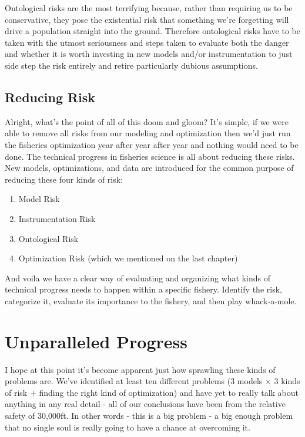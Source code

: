 \documentclass[11pt,a5paper]{book}
\begin{document}
Ontological risks are the most terrifying because, rather than requiring us to be conservative, they pose the existential risk that something we're forgetting will drive a population straight into the ground. Therefore ontological risks have to be taken with the utmost seriousness and steps taken to evaluate both the danger and whether it is worth investing in new models and/or instrumentation to just side step the risk entirely and retire particularly dubious assumptions. 

\section{Reducing Risk}
Alright, what's the point of all of this doom and gloom? It's simple, if we were able to remove all risks from our modeling and optimization then we'd just run the fisheries optimization year after year after year and nothing would need to be done. The technical progress in fisheries science is all about reducing these risks. New models, optimizations, and data are introduced for the common purpose of reducing these four kinds of risk:

\begin{enumerate}
\item Model Risk
\item Instrumentation Risk
\item Ontological Risk
\item Optimization Risk (which we mentioned on the last chapter)
\end{enumerate}

And voila we have a clear way of evaluating and organizing what kinds of technical progress needs to happen within a specific fishery. Identify the risk, categorize it, evaluate its importance to the fishery, and then play whack-a-mole. 
\newpage

\chapter{Unparalleled Progress}

I hope at this point it's become apparent just how sprawling these kinds of problems are. We've identified at least ten different problems (3 models $\times$ 3 kinds of risk $+$ finding the right kind of optimization) and have yet to really talk about anything in any real detail - all of our conclusions have been from the relative safety of 30,000ft. In other words - this is a big problem - a big enough problem that no single soul is really going to have a chance at overcoming it. 
\newline
\end{document}
